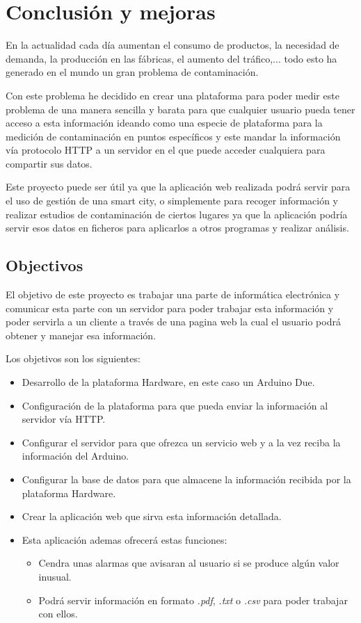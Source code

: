 
\chapter{Conclusión y mejoras}

	En la actualidad cada día aumentan el consumo de productos, la necesidad de demanda, la producción en las fábricas, el aumento del tráfico,... todo esto ha generado en el mundo un gran problema de contaminación.
	
	Con este problema he decidido en crear una plataforma para poder medir este problema de una manera sencilla y barata para que cualquier usuario pueda tener acceso a esta información ideando como una especie de plataforma para la medición de contaminación en puntos específicos y este mandar la información vía protocolo HTTP a un servidor en el que puede acceder cualquiera para compartir sus datos.
	
	Este proyecto puede ser útil ya que la aplicación web realizada podrá servir para el uso de gestión de una smart city, o simplemente para recoger información y realizar estudios de contaminación de ciertos lugares ya que la aplicación podría servir esos datos en ficheros para aplicarlos a otros programas y realizar análisis.

\section{Objectivos}

El objetivo de este proyecto es trabajar una parte de informática electrónica y comunicar esta parte con un servidor para poder trabajar esta información y poder servirla a un cliente a través de una pagina web la cual el usuario podrá obtener y manejar esa información.

Los objetivos son los siguientes:

\begin{itemize}
\item Desarrollo de la plataforma Hardware, en este caso un Arduino Due.
\item Configuración de la plataforma para que pueda enviar la información al servidor vía HTTP.
\item Configurar el servidor para que ofrezca un servicio web y a la vez reciba la información del Arduino.
\item Configurar la base de datos para que almacene la información recibida por la plataforma Hardware.
\item Crear la aplicación web que sirva esta información detallada.
\item Esta aplicación ademas ofrecerá estas funciones:
	\begin{itemize}
	\item Cendra unas alarmas que avisaran al usuario si se produce algún valor inusual.
	\item Podrá servir información en formato \textit{.pdf}, \textit{.txt} o \textit{.csv} para poder trabajar con ellos.
	
	\end{itemize}
\end{itemize}


